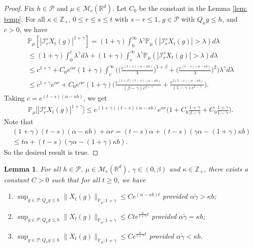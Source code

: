 \documentclass[12pt,a4paper]{amsart}
\theoremstyle{plain}
\newtheorem{lem}[thm]{Lemma}
\theoremstyle{definition}
\numberwithin{equation}{section}
\begin{document}
\begin{proof}
  Fix $h \in \mathcal P$ and $\mu \in \mathcal M_c(\mathbb R^d)$. Let $C_0$ be the constant in the Lemma \ref{lem: temp}.
  For all $\kappa \in \mathbb Z_+$,  $0\leq r\leq s\leq t$ with $s-r \leq 1$,  $g\in \mathcal P$ with $Q_{\kappa} g \leq h$, and $c>0$, we have
  \begin{align}
     & \mathbb P_\mu[|\mathcal I_r^sX_t(g)|^{1+\gamma}]
       = (1+\gamma)\int_0^\infty \lambda^{\gamma} \mathbb P_{\mu}(|\mathcal I_r^sX_t(g)|>\lambda) d\lambda \\
     & \leq (1+\gamma)\int_0^c \lambda^{\gamma} d\lambda +(1+\gamma)\int_c^\infty \lambda^{\gamma}\mathbb P_\mu(|\mathcal I_r^sX_t(g)|> \lambda) d\lambda \\
    & \leq c^{1+\gamma} + C_0  e^{\alpha r}(1+\gamma)\int_c^\infty \bigg(\Big(\frac{e^{(t-s)(\alpha - \kappa b)}}{\lambda}\Big)^{1+\beta}+\Big(\frac{e^{(t-s)(\alpha - \kappa b)}}{\lambda}\Big)^{2}\bigg)\lambda^{\gamma}d\lambda \\
    & \leq c^{1+\gamma} e^{\alpha r} + C_0e^{\alpha r}(1+\gamma)\Big(  \frac{e^{(1+\beta)(t-s)(\alpha- \kappa b)}}{(\beta - \gamma)c^{\beta - \gamma}}  + \frac{e^{2(t-s)(\alpha- \kappa b)}}{(1 - \gamma)c^{1 - \gamma}} \Big).
  \end{align}
  Taking $c = e^{(t-s)(\alpha- \kappa b)}$, we get
  \begin{align}
     & \mathbb P_\mu\big[|\mathcal I_r^s X_t(g)|^{1+\gamma}\big]
      \leq e^{(1+\gamma)(t-s)(\alpha- \kappa b)} e^{\alpha r}\Big(1+ C_0 \frac{1+\gamma}{\beta - \gamma}+ C_0 \frac{1+\gamma}{1 - \gamma}\Big).
  \end{align}
  Note that
  \begin{align}
    & (1+\gamma) (t-s) (\alpha- \kappa b) + \alpha r
      = (t-s)\alpha+(t-s) (\gamma \alpha- (1+\gamma )\kappa b) \\
    & \leq t\alpha+(t-s) (\gamma \alpha- (1+\gamma)\kappa b).
  \end{align}
  So the desired result is true.
\end{proof}

\begin{lem}
  \label{lem:P:M:uc}
  For all $h \in \mathcal P$, $\mu \in \mathcal M_c(\mathbb R^d)$, $\gamma\in (0, \beta)$ and $\kappa \in \mathbb Z_+$, there exists a constant $C > 0$ such that for all $t\geq 0$, we have
  \begin{enumerate}
  \item
    \label{item:P:M:uc:1}
    $\sup_{g\in \mathcal P: Q_\kappa g \leq h}\|X_t(g)\|_{\mathbb{P}_{\mu};1+\gamma}\leq C e^{(\alpha-\kappa b)t}$ provided $\alpha \tilde \gamma > \kappa b$;
  \item
    \label{item:P:M:uc:2}
    $\sup_{g\in \mathcal P: Q_\kappa g \leq h}\|X_t(g)\|_{\mathbb{P}_{\mu};1+\gamma}\leq C te^{\frac{\alpha}{1+\gamma}t}$ provided $\alpha \tilde \gamma = \kappa b$;
  \item
    \label{item:P:M:uc:3}
    $\sup_{g\in \mathcal P: Q_\kappa g \leq h} \|X_t(g)\|_{\mathbb{P}_{\mu};1+\gamma}\leq C e^{\frac{\alpha}{1+\gamma}t}$ provided $\alpha \tilde \gamma < \kappa b$.
  \end{enumerate}
\end{lem}
\end{document}
